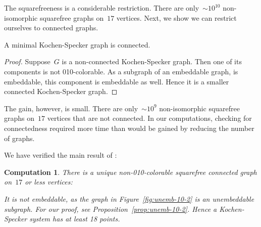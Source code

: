 \documentclass{report}
\newtheorem{comp}{Computation}[section]
\begin{document}
The squarefreeness is a considerable restriction.  There are
only~${\sim}10^{10}$ non-isomorphic squarefree graphs on~$17$
vertices.\cite{sf-sloane}
Next, we show we can restrict ourselves to connected graphs.
\begin{proposition}\label{prop:ks-conn}
    A minimal Kochen-Specker graph is connected.
\end{proposition}
\begin{proof}
    Suppose~$G$ is a non-connected Kochen-Specker graph.
    Then one of its components is not 010-colorable.
    As a subgraph of an embeddable graph, is embeddable,
    this component is embeddable as well.
    Hence it is a smaller connected Kochen-Specker graph.
\end{proof}
The gain, however, is small.
There are only~${\sim}10^9$ non-isomorphic squarefree graphs on~$17$
vertices that are not connected.
In our computations, checking for connectedness
required more time than would be gained by reducing the number of graphs.

We have verified the main result of \cite{aow11}:
\begin{comp}
There is a unique non-010-colorable squarefree connected graph on~$17$ or less
vertices:
\begin{center}
\end{center}
It is not embeddable, as the graph in Figure~\ref{fig:unemb-10-2}
is an unembeddable subgraph.  For our proof,
see Proposition~\ref{prop:unemb-10-2}.
Hence a Kochen-Specker
system has at least 18 points.
\end{comp}
\end{document}
